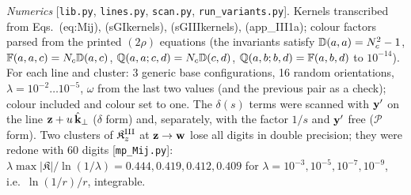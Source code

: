 \noindent\emph{Numerics} [\texttt{lib.py}, \texttt{lines.py}, \texttt{scan.py}, \texttt{run\_variants.py}]. Kernels transcribed from Eqs.~(eq:Mij), (sGIkernels), (sGIIIkernels), (app\_III1a); colour factors parsed from the printed $(2\rho)$ equations (the invariants satisfy $\mathbb{D}(a,a)=N_c^2-1$, $\mathbb{F}(a,a,c)=N_c\mathbb{D}(a,c)$, $\mathbb{Q}(a,a;c,d)=N_c\mathbb{D}(c,d)$, $\mathbb{Q}(a,b;b,d)=\mathbb{F}(a,b,d)$ to $10^{-14}$). For each line and cluster: 3 generic base configurations, 16 random orientations, $\lambda=10^{-2}\dots10^{-5}$, $\omega$ from the last two values (and the previous pair as a check); colour included and colour set to one. The $\delta(s)$ terms were scanned with $\mathbf{y}'$ on the line $\mathbf{z}+u\,\hat{\mathbf{k}}_\perp$ ($\delta$ form) and, separately, with the factor $1/s$ and $\mathbf{y}'$ free ($\mathcal P$ form). Two clusters of $\mathfrak K^{\rm III}_z$ at $\mathbf{z}\to\mathbf{w}$ lose all digits in double precision; they were redone with 60 digits [\texttt{mp\_Mij.py}]: $\lambda\max|\mathfrak K|/\ln(1/\lambda)=0.444,0.419,0.412,0.409$ for $\lambda=10^{-3},10^{-5},10^{-7},10^{-9}$, i.e.\ $\ln(1/r)/r$, integrable.

